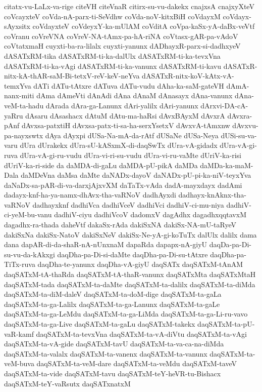 {citatx-vu-LaLx-va-rige
citeVH
citeVnaR
citirx-su-vu-dakekx
cnajxsA
cnajxyXteV
coVcayxteV
coVda-nA-parx-ti-SeVdhw
coVda-noV-kitxBiH
coVdayxM
coVdayx-sAyxsitx
coVdayxteV
coVdeyxY-ka-mUlAM
coVditA
coVpa-kaSx-yA-daBx-veVtf
coVranu
coVreVNA
coVreV-NA-tAmx-pa-hA-riNA
coVtasx-gAR-pa-vAdoV
coVtatxmaH
cuyxti-ba-ra-lilalx
cuyxti-yanunx
dADhayxR-parx-si-dadhxyeV
dASATxRM-tika
dASATxRM-ti-ka-dalUlx
dASATxRM-ti-ka-tevxVna
dASATxRM-ti-ka-vAgi
dASATxRM-ti-ka-vanunx
dASATxRM-ti-kavu
dASATxR-nitx-kA-thAR-saM-Bi-tetxV-reV-keV-neYva
dASATxR-nitx-koV-kAtx-vA-temxYva
dATi
dATu-tAtxre
dATuva
dATu-vudu
dAha-ka-saM-gateVH
dAmA-nanx-miti
dAma
dAmeVti
dAnAdi
dAna
dAnaM
dAnasayx
dAna-vanunx
dAna-veM-ta-hadu
dArada
dAra-ga-Lanunx
dAri-yalilx
dAri-yanunx
dArxvi-DA-cA-yaRru
dAsaru
dAsashacx
dAtuM
dAtu-ma-haRsi
dAvxBAyxM
dAvxrA
dAvxra-pAnf
dAvxsa-patxtiH
dAvxsa-patx-ti-sa-ha-serxYsetxV
dAvxvA-tAmxnw
dAvxvu-pa-nayxswtx
dAya
dAyxpi
dUSa-Na-mA-da-rAtf
dUSaNe
dUSa-Neya
dUSi-su-va-varu
dUra
dUrakekx
dUra-sU-kASxmX-di-daqSwTx
dUra-vA-gidadx
dUra-vA-gi-ruva
dUra-vA-gi-ru-vudu
dUra-vi-ri-su-vudu
dUra-vi-ru-vaMte
dUriV-ka-risi
dUriV-ka-ri-side
da
daMDA-di-gaLu
daMDA-pU-pikA
daMDa
daMDa-ka-maM-Dala
daMDeVna
daMsa
daMte
daNADx-dayoV
daNADx-pU-pi-ka-niV-teyxYva
daNaDx-sa-pAR-di-va-darxjAjxvXM
daTaTx-vAda
dadA-mayxdayx
dadAmi
dadayx-knf-ha-ya-namx-dhAvx-tha-vaRNoV
dadhAyxdi
dadhayx-knAknx-tha-vaRNoV
dadhayxknf
dadhiVca
dadhiVceV
dadhiVci
dadhiV-ci-mu-niya
dadhiV-ci-yeM-bu-vanu
dadhiV-ciyu
dadhiVcoV
dadomxV
dagAdhx
dagadhxqqtavxM
dagadhx-ra-thada
daheVtf
dakaSx-rAda
dakiSxNA
dakiSx-NA-mU-taRyeV
dakiSxNa
dakiSx-NatoV
dakiSxNeV
dakiSx-Ne-yA-gi-koTuTx
dalUlx
dalilx
dama
dana
dapAR-di-da-shaR-nA-nUnxnaM
dapaRda
dapapx-nA-giyU
daqDa-pa-Di-su-vu-da-kAkxgi
daqDha-pa-Di-si-daMte
daqDha-pa-Di-su-tAtxre
daqDha-pa-TiTx-ruva
daqDha-te-yanunx
daqDha-vA-giyU
daqSATx
daqSATxM-tAnAM
daqSATxM-tA-thaRda
daqSATxM-tA-thaR-vanunx
daqSATxMta
daqSATxMtaH
daqSATxM-tada
daqSATxM-ta-daMte
daqSATxM-ta-dalilx
daqSATxM-ta-diMda
daqSATxM-ta-diM-daleV
daqSATxM-ta-doM-dige
daqSATxM-ta-gaLa
daqSATxM-ta-ga-Lalilx
daqSATxM-ta-ga-Lanunx
daqSATxM-ta-gaLe
daqSATxM-ta-ga-LeMdu
daqSATxM-ta-ga-LiMda
daqSATxM-ta-ga-Li-ru-vavo
daqSATxM-ta-ga-Live
daqSATxM-ta-gaLu
daqSATxM-takekx
daqSATxM-ta-pU-vaR-kamf
daqSATxM-ta-tevxVna
daqSATxM-ta-vA-diVtu
daqSATxM-ta-vAgi
daqSATxM-ta-vA-gide
daqSATxM-tavU
daqSATxM-ta-va-ca-na-diMda
daqSATxM-ta-valalx
daqSATxM-ta-vanenx
daqSATxM-ta-vanunx
daqSATxM-ta-veM-buva
daqSATxM-ta-veM-dare
daqSATxM-ta-veMdu
daqSATxM-taveV
daqSATxM-ta-vide
daqSATxM-tavu
daqSATxM-teY-heVR-tu-Bishacx
daqSATxM-teY-vaRsutx
daqSATxnatxM
}
